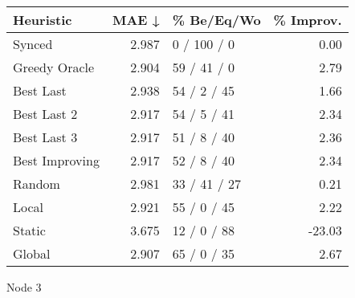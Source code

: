 \begin{tabular}{lrlr}
\toprule
\textbf{Heuristic} & \textbf{MAE ↓} & \textbf{\% Be/Eq/Wo} & \textbf{\% Improv.} \\
\midrule
            Synced &          2.987 &          0 / 100 / 0 &                0.00 \\
     Greedy Oracle &          2.904 &          59 / 41 / 0 &                2.79 \\
         Best Last &          2.938 &          54 / 2 / 45 &                1.66 \\
       Best Last 2 &          2.917 &          54 / 5 / 41 &                2.34 \\
       Best Last 3 &          2.917 &          51 / 8 / 40 &                2.36 \\
    Best Improving &          2.917 &          52 / 8 / 40 &                2.34 \\
            Random &          2.981 &         33 / 41 / 27 &                0.21 \\
             Local &          2.921 &          55 / 0 / 45 &                2.22 \\
            Static &          3.675 &          12 / 0 / 88 &              -23.03 \\
            Global &          2.907 &          65 / 0 / 35 &                2.67 \\
\bottomrule
\end{tabular}
\caption{Node 3}
\label{tab:hr_non_lr01_le1_bs4_3}
